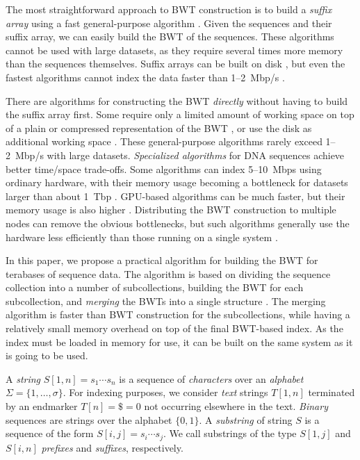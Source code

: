 \documentclass[smallabstract,smallcaptions]{dccpaper}
\newcommand{\set}[1]{\ensuremath{\{ #1 \}}}
\newcommand{\BWT}{\textsf{BWT}}
\begin{document}
The most straightforward approach to \BWT{} construction is to build a \emph{suffix array} using a fast general-purpose algorithm \cite{Mori2008,Nong2011}. Given the sequences and their suffix array, we can easily build the \BWT{} of the sequences. These algorithms cannot be used with large datasets, as they require several times more memory than the sequences themselves. Suffix arrays can be built on disk \cite{Gonnet1992}, but even the fastest algorithms cannot index the data faster than 1\nobreakdash--2~Mbp/s
\cite{Kaerkkaeinen2015a}.

There are algorithms for constructing the \BWT{} \emph{directly} without having to build the suffix array first. Some require only a limited amount of working space on top of a plain or compressed representation of the \BWT{} \cite{Hon2007,Kaerkkaeinen2007,Siren2009,Okanohara2009}, or use the disk as additional working space \cite{Ferragina2012,Beller2013}. These general-purpose algorithms rarely exceed 1\nobreakdash--2~Mbp/s with large datasets. \emph{Specialized algorithms} for DNA sequences achieve better time/space trade-offs. Some algorithms can index 5\nobreakdash--10~Mbps using ordinary hardware, with their memory usage becoming a bottleneck for datasets larger than about 1~Tbp \cite{Bauer2013,Li2014a}. GPU-based algorithms can be much faster, but their memory usage is also higher \cite{Liu2014,Pantaleoni2014}. Distributing the \BWT{} construction to multiple nodes can remove the obvious bottlenecks, but such algorithms generally use the hardware less efficiently than those running on a single system \cite{Wang2015}.

In this paper, we propose a practical algorithm for building the \BWT{} for terabases of sequence data. The algorithm is based on dividing the sequence collection into a number of subcollections, building the \BWT{} for each subcollection, and \emph{merging} the \BWT{}s into a single structure \cite{Siren2009}. The merging algorithm is faster than \BWT{} construction for the subcollections, while having a relatively small memory overhead on top of the final \BWT-based index. As the index must be loaded in memory for use, it can be built on the same system as it is going to be used.



A \emph{string} $S[1,n] = s_{1} \dotsm s_{n}$ is a sequence of \emph{characters} over an \emph{alphabet} $\Sigma = \set{1, \dotsc, \sigma}$. For indexing purposes, we consider \emph{text} strings $T[1,n]$ terminated by an endmarker $T[n] = \$ = 0$ not occurring elsewhere in the text. \emph{Binary} sequences are strings over the alphabet $\set{0, 1}$. A \emph{substring} of string $S$ is a sequence of the form $S[i,j] = s_{i} \dotsm s_{j}$. We call substrings of the type $S[1,j]$ and $S[i,n]$ \emph{prefixes} and \emph{suffixes}, respectively.
\end{document}
